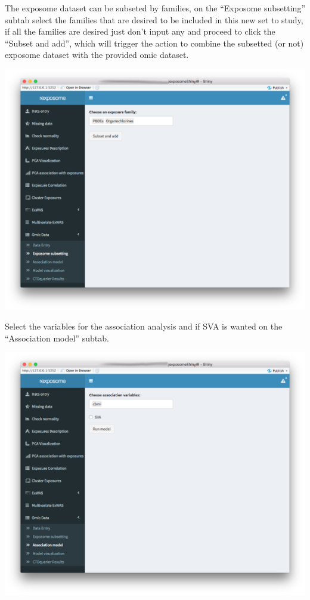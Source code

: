 \documentclass[
]{book}
\begin{document}
The exposome dataset can be subseted by families, on the ``Exposome subsetting'' subtab select the families that are desired to be included in this new set to study, if all the families are desired just don't input any and proceed to click the ``Subset and add'', which will trigger the action to combine the subsetted (or not) exposome dataset with the provided omic dataset.

\includegraphics{images/analysis9_3.png}

Select the variables for the association analysis and if SVA is wanted on the ``Association model'' subtab.

\includegraphics{images/analysis9_4.png}
\end{document}

